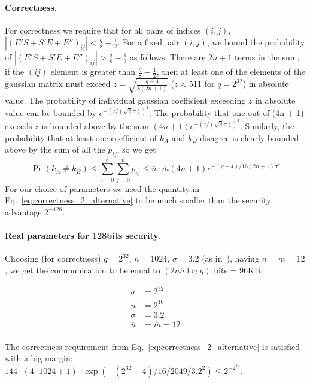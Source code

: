 \documentclass[12pt]{article}
\newcommand{\nbar}{\overline{n}}
\newcommand{\mbar}{\overline{m}}
\begin{document}
\paragraph{Correctness.} For correctness we require that for all pairs of indices $(i, j)$, $|(E'S + S'E + E'')_{ij}| < \frac{q}{8} - \frac{1}{2}$. For a fixed pair $(i, j)$, we bound the probability of $|(E'S + S'E + E'')_{ij}| > \frac{q}{8} - \frac{1}{2}$ as follows. There are $2n + 1$ terms in the sum, if the $(ij)$ element is greater than $\frac{q}{8} - \frac{1}{2}$, then at least one of the elements of the gaussian matrix must exceed $z = \sqrt{\frac{q - 4}{8 (2n + 1)}}$ ($z \approx 511$ for $q = 2^{32}$) in absolute value. The probability of individual gaussian coefficient exceeding $z$ in absolute value can be bounded by $e^{-(z / (\sqrt{2}\sigma))^2}$. The probability that one out of (4n + 1) exceeds $z$ is bounded above by the sum $(4n + 1)e^{-(z / (\sqrt{2}\sigma))^2}$. Similarly, the probability that at least one coefficient of $k_A$ and $k_B$ disagree is clearly bounded above by the sum of all the $p_{ij}$, so we get
\begin{equation}
\Pr(k_A \neq k_B) \leq \sum_{i = 0}^{\nbar} \sum_{j = 0}^{\nbar} p_{ij} \leq \nbar \cdot \mbar (4n + 1)e^{-(q - 4)/ 16 (2n + 1)\sigma^2}
\label{eq:correctness_2_alternative}
\end{equation}
For our choice of parameters we need the quantity in Eq.~\ref{eq:correctness_2_alternative} to be much smaller than the security advantage $2^{-128}$.
 
\paragraph{Real parameters for 128bits security.}
Choosing (for correctness) $q = 2^{32}$, $n = 1024$, $\sigma = 3.2$ (as in~\cite{BCNS14}), having $\nbar = \mbar = 12$, we get the communication to be equal to $(2 n \nbar \log q)$ bits = 96KB.

\begin{equation*}
   \boxed{
   \begin{aligned}
     q &= 2^{32}\\
     n &= 2^{10}\\
     \sigma &= 3.2\\
     \nbar &= \mbar = 12\\
     \end{aligned}
}
\end{equation*}

The correctness requirement from Eq.~\ref{eq:correctness_2_alternative} is satisfied with a big margin: $144 \cdot (4 \cdot 1024 + 1) \cdot \exp(-(2^{32} - 4) / 16 / 2049 / 3.2^2) \leq 2^{-2^{14}}$.
\end{document}

